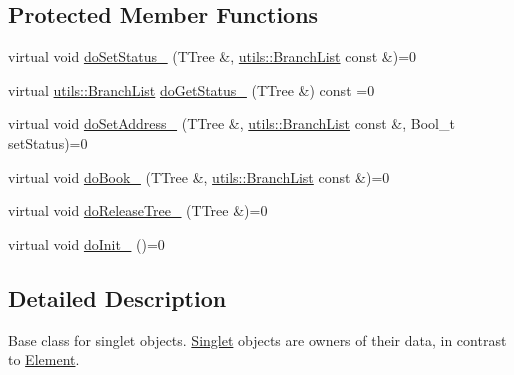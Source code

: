 \subsection*{Protected Member Functions}
\begin{DoxyCompactItemize}
\item 
virtual void \hyperlink{classpanda_1_1Singlet_a660799e379f7949f3b8e2d74f6e1ddb2}{doSetStatus\_\-} (TTree \&, \hyperlink{classpanda_1_1utils_1_1BranchList}{utils::BranchList} const \&)=0
\item 
virtual \hyperlink{classpanda_1_1utils_1_1BranchList}{utils::BranchList} \hyperlink{classpanda_1_1Singlet_ad2749c2f28a2970eda99db906a116881}{doGetStatus\_\-} (TTree \&) const =0
\item 
virtual void \hyperlink{classpanda_1_1Singlet_a7ca72a80987071e7176c51947e319474}{doSetAddress\_\-} (TTree \&, \hyperlink{classpanda_1_1utils_1_1BranchList}{utils::BranchList} const \&, Bool\_\-t setStatus)=0
\item 
virtual void \hyperlink{classpanda_1_1Singlet_ab72b7d0fc56f6c5cfe4b8200c8927b1b}{doBook\_\-} (TTree \&, \hyperlink{classpanda_1_1utils_1_1BranchList}{utils::BranchList} const \&)=0
\item 
virtual void \hyperlink{classpanda_1_1Singlet_ad5acaa19bf3a8c360cf2e36604ab4530}{doReleaseTree\_\-} (TTree \&)=0
\item 
virtual void \hyperlink{classpanda_1_1Singlet_af5afe7bf7b223c51d1763953ac24d261}{doInit\_\-} ()=0
\end{DoxyCompactItemize}


\subsection{Detailed Description}
Base class for singlet objects. \hyperlink{classpanda_1_1Singlet}{Singlet} objects are owners of their data, in contrast to \hyperlink{classpanda_1_1Element}{Element}. 

